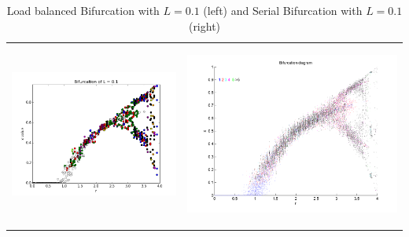 \documentclass[12pt]{article}
\begin{document}
\begin {table}[H]
\begin{center}
\begin{tabular}{ p{8cm} p{8cm}}    
\begin{center}\includegraphics[scale=0.4]{Bifurcation_L1}\end{center}&\begin{center} \includegraphics[scale=0.4]{bif}\end{center}
\end{tabular}
\caption {Load balanced Bifurcation with $L=0.1$ (left) and Serial Bifurcation with $L=0.1$ (right)} \label{bif}
\end{center}
\end {table}
\end{document}
